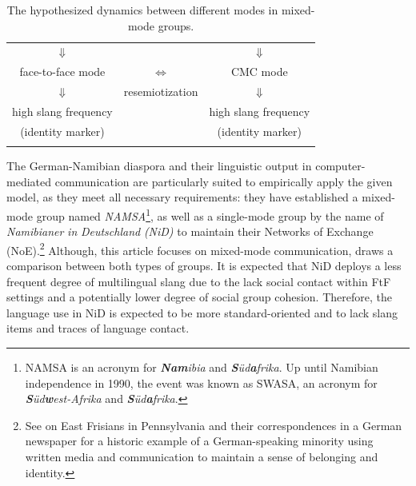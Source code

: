 \documentclass[output=paper]{langsci/langscibook}
\begin{document}
\begin{table}
\begin{tabular}{ccc}
\lsptoprule
\multicolumn{3}{c}{mixed-mode groups (in language-contact settings)}\\
\midrule
${\Downarrow}$ & & ${\Downarrow}$ \\
face-to-face mode & ${\Leftrightarrow}$ & {CMC mode}\\
${\Downarrow}$ & resemiotization & ${\Downarrow}$ \\
 high slang frequency & & high slang frequency\\
(identity marker) & & (identity marker) \\
\lspbottomrule
\end{tabular}
\caption{The hypothesized dynamics between different modes in mixed-mode groups.\label{tab:radke:1}}
\end{table}  



The German-Namibian diaspora and their linguistic output in computer-mediated communication are particularly suited to empirically apply the given model, as they meet all necessary requirements: they have established a mixed-mode group named \textit{NAMSA}\footnote{NAMSA is an acronym for \textbf{\textit{Nam}}\textit{ibia} and \textbf{\textit{S}}\textit{üd}\textbf{\textit{a}}\textit{frika}. Up until Namibian independence in 1990, the event was known as SWASA, an acronym for \textbf{\textit{S}}\textit{üd}\textbf{\textit{w}}\textit{est-Afrika} and \textbf{\textit{S}}\textit{üd}\textbf{\textit{a}}\textit{frika}.}, as well as a single-mode group by the name of \textit{Namibianer} \textit{in} \textit{Deutschland} \textit{(NiD)} to maintain their Networks of Exchange (NoE).\footnote{See  on East Frisians in Pennsylvania and their correspondences in a German newspaper for a historic example of a German-speaking minority using written media and communication to maintain a sense of belonging and identity.} Although, this article focuses on mixed-mode communication,  draws a comparison between both types of groups. It is expected that NiD deploys a less frequent degree of multilingual slang due to the lack social contact within FtF settings and a potentially lower degree of social group cohesion. Therefore, the language use in NiD is expected to be more standard-oriented and to lack slang items and traces of language contact.%
\end{document}
